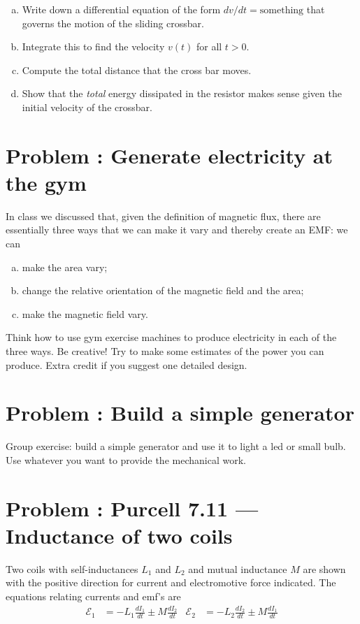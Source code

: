 \documentclass[problems]{esg8022pset}
\begin{document}
  \begin{enumerate}[(a)]
    \item Write down a differential equation of the form $dv/dt =
      \text{something}$ that governs the motion of the sliding crossbar.
    \item Integrate this to find the velocity $v(t)$ for all $t > 0$.
    \item Compute the total distance that the cross bar moves.
    \item Show that the \emph{total} energy dissipated in the resistor makes
      sense given the initial velocity of the crossbar.
  \end{enumerate}
\section{Problem \thesection: Generate electricity at the gym}
  In class we discussed that, given the definition of magnetic flux, there are
  essentially three ways that we can make it vary and thereby create an EMF: we
  can
  \begin{enumerate}[(a)]
    \item make the area vary;
    \item change the relative orientation of the magnetic field and the area;
    \item make the magnetic field vary.
  \end{enumerate}

  Think how to use gym exercise machines to produce electricity in each of the
  three ways. Be creative!
  Try to make some estimates of the power you can produce. Extra credit if you
  suggest one detailed design.
\section{Problem \thesection: Build a simple generator}
  Group exercise: build a simple generator and use it to light a led or small
  bulb. Use whatever you want to provide the mechanical work.
\section{Problem \thesection: Purcell 7.11 --- Inductance of two coils}
  Two coils with self-inductances $L_1$ and $L_2$ and mutual inductance $M$
  are shown with the positive direction for current and electromotive force
  indicated. The equations relating currents and emf's are
  \begin{align*}
    \mathcal{E}_1 & = -L_1\frac{dI_1}{dt}\pm M\frac{dI_2}{dt}
    & \mathcal{E}_2 & = -L_2\frac{dI_2}{dt}\pm M\frac{dI_1}{dt}
  \end{align*}
\end{document}
